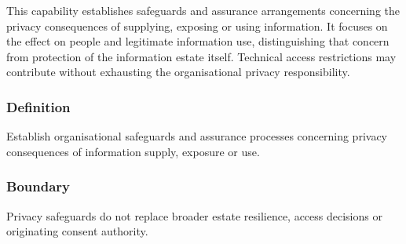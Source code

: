 This capability establishes safeguards and assurance arrangements concerning the privacy consequences of supplying, exposing or using information. It focuses on the effect on people and legitimate information use, distinguishing that concern from protection of the information estate itself. Technical access restrictions may contribute without exhausting the organisational privacy responsibility.

\subsubsection*{Definition}

Establish organisational safeguards and assurance processes concerning privacy consequences of information supply, exposure or use.

\subsubsection*{Boundary}

Privacy safeguards do not replace broader estate resilience, access decisions or originating consent authority.

